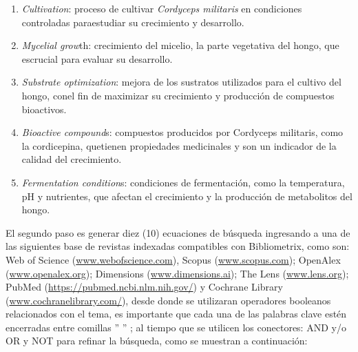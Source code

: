 \documentclass[
  spanish,
  letterpaper,
  DIV=11,
  numbers=noendperiod]{scrreprt}
\begin{document}
\begin{enumerate}
\def\labelenumi{\arabic{enumi}.}
\item
  \emph{Cultivation}: proceso de cultivar \emph{Cordyceps militaris} en
  condiciones controladas paraestudiar su crecimiento y desarrollo.
\item
  \emph{Mycelial grow}th: crecimiento del micelio, la parte vegetativa
  del hongo, que escrucial para evaluar su desarrollo.
\item
  \emph{Substrate optimization}: mejora de los sustratos utilizados para
  el cultivo del hongo, conel fin de maximizar su crecimiento y
  producción de compuestos bioactivos.
\item
  \emph{Bioactive compound}s: compuestos producidos por Cordyceps
  militaris, como la cordicepina, quetienen propiedades medicinales y
  son un indicador de la calidad del crecimiento.
\item
  \emph{Fermentation condition}s: condiciones de fermentación, como la
  temperatura, pH y nutrientes, que afectan el crecimiento y la
  producción de metabolitos del hongo.
\end{enumerate}

El segundo paso es generar diez (10) ecuaciones de búsqueda ingresando a
una de las siguientes base de revistas indexadas compatibles con
Bibliometrix, como son: Web of Science
(\href{http://www.webofscience.com}{www.webofscience.com}), Scopus
(\href{http://www.scopus.com}{www.scopus.com}); OpenAlex
(\href{http://www.openalex.org}{www.openalex.org}); Dimensions
(\href{http://www.dimensions.ai}{www.dimensions.ai}); The Lens
(\href{http://www.lens.org}{www.lens.org}); PubMed
(\url{https://pubmed.ncbi.nlm.nih.gov/}) y Cochrane Library
(\href{http://www.cochranelibrary.com/}{www.cochranelibrary.com/}),
desde donde se utilizaran operadores booleanos relacionados con el tema,
es importante que cada una de las palabras clave estén encerradas entre
comillas '' '' ; al tiempo que se utilicen los conectores: AND y/o OR y
NOT para refinar la búsqueda, como se muestran a continuación:
\end{document}
